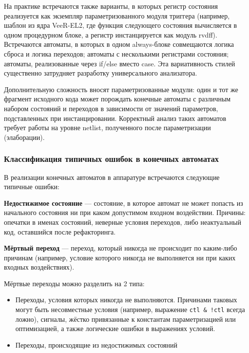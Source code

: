 На практике встречаются также варианты, в которых регистр состояния реализуется как экземпляр
параметризованного модуля триггера (например, шаблон из ядра VeeR-EL2, где функция следующего состояния
вычисляется в одном процедурном блоке, а регистр инстанцируется как модуль rvdff). Встречаются автоматы,
в которых в одном always-блоке совмещаются логика сброса и логика переходов; автоматы с несколькими
регистрами состояния; автоматы, реализованные через if/else вместо case. Эта вариативность стилей
существенно затрудняет разработку универсального анализатора.

Дополнительную сложность вносят параметризованные модули: один и тот же фрагмент исходного кода может
порождать конечные автоматы с различным набором состояний и переходов в зависимости от значений параметров,
подставленных при инстанцировании. Корректный анализ таких автоматов требует работы на уровне netlist,
полученного после параметризации (элаборации).

\subsubsection{Классификация типичных ошибок в конечных автоматах}

В реализации конечных автоматов в аппаратуре встречаются следующие типичные ошибки:

\textbf{Недостижимое состояние} --- состояние, в которое автомат не может попасть из начального
состояния ни при каком допустимом входном воздействии. Причины: опечатки в именах
состояний, неверные условия переходов, либо неактуальный код, оставшийся после рефакторинга.

\textbf{Мёртвый переход} --- переход, который никогда не происходит по каким-либо причинам (например, 
условие которого никогда не выполняется ни при каких входных
воздействиях).

Мёртвые переходы можно разделить на 2 типа:

\begin{itemize}
    \item Переходы, условия которых никогда не выполняются. Причинами таковых могут быть несовместные
    условия (например, выражение \texttt{ctl \& !ctl} всегда ложно), сигналы, жёстко привязанные к
    константам параметризацией или оптимизацией, а также логические ошибки в выражениях условий.
    \item Переходы, происходящие из недостижимых состояний
\end{itemize}

